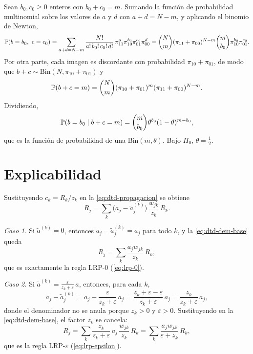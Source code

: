 \begin{demostracion}
Sean $b_0, c_0 \ge 0$ enteros con $b_0 + c_0 = m$. Sumando la función de probabilidad multinomial sobre los valores de $a$ y $d$ con $a + d = N - m$, y aplicando el binomio de Newton,
\[
  \mathbb{P}(b = b_0,\ c = c_0)
  = \sum_{a + d = N - m} \frac{N!}{a!\, b_0!\, c_0!\, d!}\, \pi_{11}^{a} \pi_{10}^{b_0} \pi_{01}^{c_0} \pi_{00}^{d}
  = \binom{N}{m} (\pi_{11} + \pi_{00})^{N - m} \binom{m}{b_0} \pi_{10}^{b_0} \pi_{01}^{c_0}.
\]
Por otra parte, cada imagen es discordante con probabilidad $\pi_{10} + \pi_{01}$, de modo que $b + c \sim \mathrm{Bin}(N, \pi_{10} + \pi_{01})$ y
\[
  \mathbb{P}(b + c = m) = \binom{N}{m} (\pi_{10} + \pi_{01})^{m} (\pi_{11} + \pi_{00})^{N - m}.
\]
Dividiendo,
\[
  \mathbb{P}(b = b_0 \mid b + c = m) = \binom{m}{b_0} \theta^{b_0} (1 - \theta)^{m - b_0},
\]
que es la función de probabilidad de una $\mathrm{Bin}(m, \theta)$. Bajo $H_0$, $\theta = \tfrac12$.
\end{demostracion}

\section{Explicabilidad}\label{sec:dem-explicabilidad}

\begin{demostracion}
Sustituyendo $c_k = R_k / z_k$ en la \cref{eq:dtd-propagacion} se obtiene
\begin{equation}\label{eq:dtd-dem-base}
  R_j = \sum_{k} \bigl(a_j - \tilde{a}^{(k)}_j\bigr) \, \frac{w_{jk}}{z_k} \, R_k .
\end{equation}

\emph{Caso 1.} Si $\tilde{a}^{(k)} = 0$, entonces
$a_j - \tilde{a}^{(k)}_j = a_j$ para todo $k$, y la \cref{eq:dtd-dem-base} queda
\[
  R_j = \sum_{k} \frac{a_j w_{jk}}{z_k} \, R_k ,
\]
que es exactamente la regla LRP-0 (\cref{eq:lrp-0}).

\emph{Caso 2.} Si $\tilde{a}^{(k)} = \frac{\varepsilon}{z_k + \varepsilon}\, a$,
entonces, para cada $k$,
\[
  a_j - \tilde{a}^{(k)}_j
  = a_j - \frac{\varepsilon}{z_k + \varepsilon}\, a_j
  = \frac{z_k + \varepsilon - \varepsilon}{z_k + \varepsilon}\, a_j
  = \frac{z_k}{z_k + \varepsilon}\, a_j ,
\]
donde el denominador no se anula porque $z_k > 0$ y $\varepsilon > 0$.
Sustituyendo en la \cref{eq:dtd-dem-base}, el factor $z_k$ se cancela:
\[
  R_j = \sum_{k} \frac{z_k}{z_k + \varepsilon}\, a_j \, \frac{w_{jk}}{z_k} \, R_k
      = \sum_{k} \frac{a_j w_{jk}}{\varepsilon + z_k} \, R_k ,
\]
que es la regla LRP-$\varepsilon$ (\cref{eq:lrp-epsilon}).
\end{demostracion}

